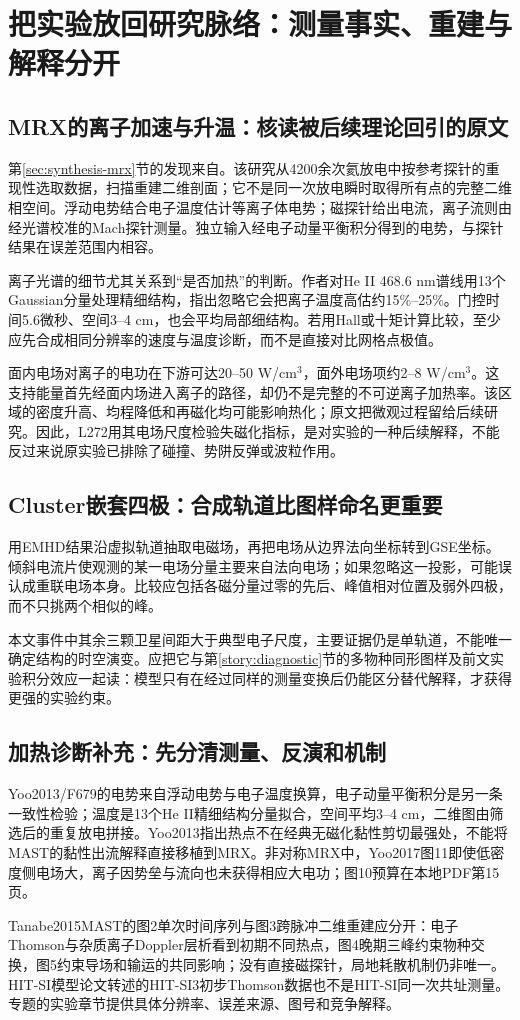\section{把实验放回研究脉络：测量事实、重建与解释分开}
\subsection{MRX的离子加速与升温：核读被后续理论回引的原文}
第\ref{sec:synthesis-mrx}节的发现来自\citet{Yoo2013}。该研究从4200余次氦放电中按参考探针的重现性选取数据，扫描重建二维剖面；它不是同一次放电瞬时取得所有点的完整二维相空间。浮动电势结合电子温度估计等离子体电势；磁探针给出电流，离子流则由经光谱校准的Mach探针测量。独立输入经电子动量平衡积分得到的电势，与探针结果在误差范围内相容。

离子光谱的细节尤其关系到“是否加热”的判断。作者对He II 468.6 nm谱线用13个Gaussian分量处理精细结构，指出忽略它会把离子温度高估约15\%--25\%。门控时间5.6微秒、空间3--4 cm，也会平均局部细结构。若用Hall或十矩计算比较，至少应先合成相同分辨率的速度与温度诊断，而不是直接对比网格点极值。

面内电场对离子的电功在下游可达20--50 W/cm$^3$，面外电场项约2--8 W/cm$^3$。这支持能量首先经面内场进入离子的路径，却仍不是完整的不可逆离子加热率。该区域的密度升高、均程降低和再磁化均可能影响热化；原文把微观过程留给后续研究。因此，L272用其电场尺度检验失磁化指标，是对实验的一种后续解释，不能反过来说原实验已排除了碰撞、势阱反弹或波粒作用。\citep{Yoo2013,L272}

\subsection{Cluster嵌套四极：合成轨道比图样命名更重要}
\citet{L213}用EMHD结果沿虚拟轨道抽取电磁场，再把电场从边界法向坐标转到GSE坐标。倾斜电流片使观测的某一电场分量主要来自法向电场；如果忽略这一投影，可能误认成重联电场本身。比较应包括各磁分量过零的先后、峰值相对位置及弱外四极，而不只挑两个相似的峰。

本文事件中其余三颗卫星间距大于典型电子尺度，主要证据仍是单轨道，不能唯一确定结构的时空演变。应把它与第\ref{story:diagnostic}节的多物种同形图样及前文实验积分效应一起读：模型只有在经过同样的测量变换后仍能区分替代解释，才获得更强的实验约束。


\subsection{加热诊断补充：先分清测量、反演和机制}
Yoo2013/F679的电势来自浮动电势与电子温度换算，电子动量平衡积分是另一条一致性检验；温度是13个He II精细结构分量拟合，空间平均3--4 cm，二维图由筛选后的重复放电拼接。Yoo2013指出热点不在经典无磁化黏性剪切最强处，不能将MAST的黏性出流解释直接移植到MRX。非对称MRX中，Yoo2017图11即使低密度侧电场大，离子因势垒与流向也未获得相应大电功；图10预算在本地PDF第15页。\citep{Yoo2013,F679,Yoo2017Heating}

Tanabe2015MAST的图2单次时间序列与图3跨脉冲二维重建应分开：电子Thomson与杂质离子Doppler层析看到初期不同热点，图4晚期三峰约束物种交换，图5约束导场和输运的共同影响；没有直接磁探针，局地耗散机制仍非唯一。HIT-SI模型论文转述的HIT-SI3初步Thomson数据也不是HIT-SI同一次共址测量。专题的实验章节提供具体分辨率、误差来源、图号和竞争解释。\citep{Tanabe2015MAST,Kaptanoglu2020}
